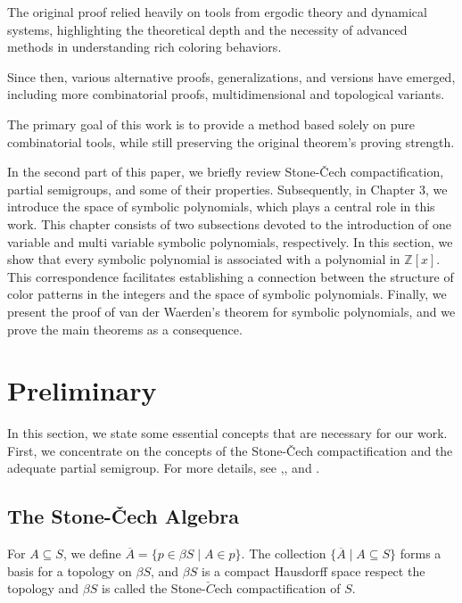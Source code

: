 \documentclass{amsart}
\theoremstyle{definition}
\theoremstyle{remark}
\numberwithin{equation}{section}
\begin{document}
	 The original proof relied heavily on tools from ergodic theory and dynamical systems, highlighting the theoretical depth and the necessity of advanced methods in understanding rich coloring behaviors.
	
	Since then, various alternative proofs, generalizations, and versions have emerged, including more combinatorial proofs, multidimensional and topological variants.
	
	 The primary goal of this work is to provide a method based solely on pure combinatorial tools, while still preserving the original theorem's proving strength.
	


In the second part of this paper, we briefly review Stone-\v Cech compactification, partial semigroups, and some of their properties. Subsequently, in Chapter 3, we introduce the space of symbolic polynomials, which plays a central role in this work. This chapter consists of two subsections devoted to the introduction of one variable and multi variable symbolic polynomials, respectively. In this section, we show that every symbolic polynomial is associated with a polynomial in $\mathbb{Z}[x]$. This correspondence facilitates establishing a connection between the structure of color patterns in the integers and the space of symbolic polynomials. Finally, we present the proof of van der Waerden's theorem for symbolic polynomials, and we prove the main theorems as a consequence.
	


			
\section{Preliminary}
In this section, we state some essential concepts that are necessary for our work. First, we concentrate on the concepts of the Stone-\v Cech compactification and the adequate partial semigroup. For more details, see \cite{Hindman},\cite{McCutcheon}, \cite{McLeod} and \cite{McLeod1}.

\subsection{The Stone-\v Cech Algebra} 
For \(A \subseteq S\), we define $\overline{A} = \{p \in \beta S \mid A \in p\}$. The collection \(\{\overline{A} \mid A \subseteq S\}\) forms a basis for a topology on \(\beta S\), and $\beta S$ is a compact Hausdorff space respect the topology and $\beta S$ is called the Stone-$\check{C}$ech compactification of \(S\).
\end{document}
